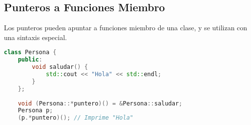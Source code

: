 \subsection{Punteros a Funciones Miembro}

Los punteros pueden apuntar a funciones miembro de una clase, y se utilizan con una sintaxis especial.

\begin{lstlisting}[language=C++]
    class Persona {
    public:
        void saludar() {
            std::cout << "Hola" << std::endl;
        }
    };
    
    void (Persona::*puntero)() = &Persona::saludar;
    Persona p;
    (p.*puntero)(); // Imprime "Hola"
\end{lstlisting}